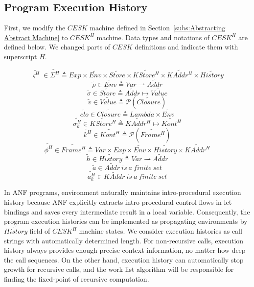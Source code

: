 \documentclass{article}
\begin{document}
\subsection{Program Execution History}
\label{sub:Program Execution History}
First, we modify the $CESK$ machine defined in Section~\ref{subs:Abstracting Abstract Machine} to $CESK^H$ machine.
Data types and notations of $CESK^H$ are defined below. We changed parts of $CESK$ definitions and indicate them with superscript $H$.

\[
\tag{states}
\widetilde{\varsigma^H}\in\widetilde{\Sigma^H} \triangleq Exp \times \widetilde{Env} \times \widetilde{Store}
\times \widetilde{KStore^H} \times \widetilde{KAddr^H} \times \widetilde{History}
\]
\[
\tag{environments}
\widetilde{\rho} \in \widetilde{Env} \triangleq Var \rightharpoonup \widetilde{Addr}
\]
\[
\tag{stores}
\widetilde{\sigma} \in \widetilde{Store} \triangleq \widetilde{Addr} \mapsto \widetilde{Value}
\]
\[
\tag{abstract values}
\widetilde{v} \in \widetilde{Value} \triangleq \mathcal{P}(\widetilde{Closure})
\]
\[
\tag{closures}
\widetilde{clo} \in \widetilde{Closure} \triangleq Lambda \times \widetilde{Env}
\]
\[
\tag{continuation stores}
\widetilde{\sigma_k^H} \in \widetilde{KStore^H} \triangleq  \widetilde{KAddr^H} \mapsto  \widetilde{Kont^H}
\]
\[
\tag{abstract continuations}
\widetilde{k^H} \in  \widetilde{Kont^H} \triangleq  \mathcal{P}(\widetilde{Frame^H})
\]
\[
\tag{stack frames}
\widetilde{\phi^H} \in  \widetilde{Frame^H} \triangleq Var \times Exp \times  \widetilde{Env} \times \widetilde{History} \times  \widetilde{KAddr^H}
\]
\[
\tag{histories}
\widetilde{h} \in \widetilde{History} \triangleq Var \rightharpoonup \widetilde{Addr}
\]
\[
\tag{value addresses}
\widetilde{a} \in \widetilde{Addr} \ is\ a\ finite\ set
\]
\[
\tag{continuation addresses}
\widetilde{a_k^H} \in \widetilde{KAddr} \ is\ a\ finite\ set
\]

In ANF programs, environment naturally maintains intro-procedural execution history because ANF explicitly extracts intro-procedural control flows in let-bindings and saves every intermediate result in a local variable.
Consequently, the program execution histories can be implemented as propagating environments by $\widetilde{History}$ field of $CESK^H$ machine states.
We consider execution histories as call strings with automatically determined length. For non-recursive calls, execution history always provides enough precise context information, no matter how deep the call sequences. On the other hand, execution history can automatically stop growth for recursive calls, and the work list algorithm will be responsible for finding the fixed-point of recursive computation.
\end{document}
